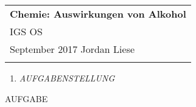 \documentclass[a4paper, 12pt]{article}
\def \dtitle {Chemie: Auswirkungen von Alkohol}
\begin{document}
\thispagestyle{empty}

\begin{tabular}{p{15.5cm}}
{\large \bf \dtitle} \\
IGS OS\\ September 2017 \hspace*{10.5cm} Jordan Liese\\
\midrule
\\
\end{tabular}

\vspace*{0.3cm}
\vspace{0.4cm}

\begin{enumerate}
\item{\textit{ AUFGABENSTELLUNG }}
\end{enumerate}

AUFGABE
\end{document}

